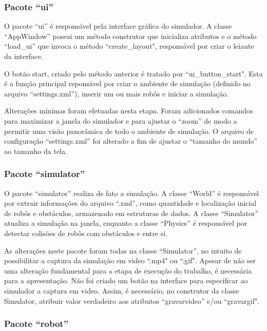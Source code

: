 	\subsubsection{Pacote ``ui''}
	
	O pacote ``ui'' é responsável pela interface gráfica do simulador. A classe
	``AppWindow'' possui um método construtor que inicializa atributos e o
	método ``load\_ui'' que invoca o método ``create\_layout", responsável por
	criar o leiaute da interface.
	
	O botão start, criado pelo método anterior é tratado por ``ui\_button\_start".
	Esta é a função principal reponsável por criar o ambiente de simulação
	(definido no arquivo ``settings.xml''), inserir um ou mais robôs e iniciar a
	simulação.
	
	Alterações mínimas foram efetuadas nesta etapa. Foram adicionados comandos para
	maximizar a janela do simulador e para ajustar o ``zoom'' de modo a permitir uma
	visão panorâmica de todo o ambiente de simulação. O arquivo de configuração
	``settings.xml'' foi alterado a fim de ajustar o ``tamanho do mundo'' ao
	tamanho da	tela.
	
	\subsubsection{Pacote ``simulator''}
	
	O pacote ``simulator'' realiza de fato a simulação. A classe ``World'' é
	responsável por extrair informações do arquivo ``.xml'', como quantidade e
	localização inicial de robôs e obstáculos, armazenado em estruturas de dados.
	A classe ``Simulator'' atualiza a simulação na janela, enquanto a
	classe ``Physics'' é responsável por detectar colisões de robôs com obstáculos
	e entre si. 
	
	As alterações neste pacote foram todas na classe ``Simulator'', no intuito
	de possibilitar a captura da simulação em video ``.mp4" ou ``.gif". Apesar de
	não ser uma alteração fundamental para a etapa de execução do trabalho, é
	necessária para a apresentação. Não foi criado um botão na interface para
	especificar ao simulador a captura em video. Assim, é necessário, no
	construtor da classe Simulator, atribuir valor verdadeiro aos atributos
	``gravarvideo'' e/ou ``gravargif". 
	
	\subsubsection{Pacote ``robot''}
	
